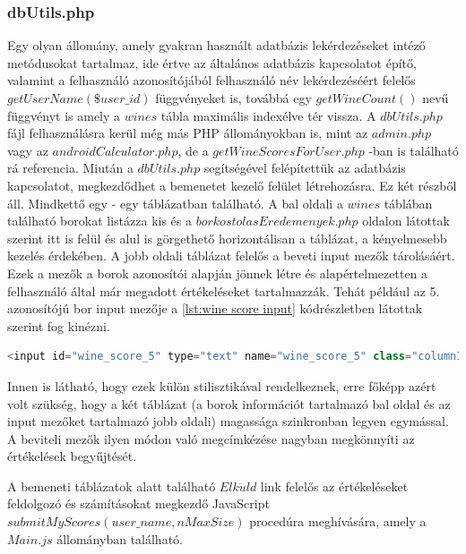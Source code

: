 \documentclass[12pt]{report}
\theoremstyle{definition}
\begin{document}
	\subsubsection{dbUtils.php} 
	Egy olyan állomány, amely gyakran használt adatbázis lekérdezéseket intéző metódusokat tartalmaz, ide értve az általános adatbázis kapcsolatot építő, valamint a felhasználó azonosítójából felhasználó név lekérdezéséért felelős $getUserName\left(\$user\_id\right)$ függvényeket is, továbbá egy $getWineCount\left(\right)$ nevű függvényt is amely a $wines$ tábla maximális indexélve tér vissza. A $dbUtils.php$ fájl felhasználásra kerül még más PHP állományokban is, mint az $admin.php$ vagy az  $androidCalculator.php$, de a \linebreak $getWineScoresForUser.php$ -ban is található rá referencia.
	\newline
	\newline
	Miután a $dbUtils.php$ segítségével felépítettük az adatbázis kapcsolatot, megkezdődhet a bemenetet kezelő felület létrehozásra. Ez két részből áll. Mindkettő egy - egy táblázatban található. A bal oldali a $wines$ táblában található borokat listázza kis és a \linebreak$borkostolasEredemenyek.php$ oldalon látottak szerint itt is felül és alul is görgethető horizontálisan a táblázat, a kényelmesebb kezelés érdekében. A jobb oldali táblázat felelős a beveti input mezők tárolásáért. Ezek a mezők a borok azonosítói alapján jönnek létre és alapértelmezetten a felhasználó által már megadott értékeléseket tartalmazzák. Tehát például az 5. azonosítójú bor input mezője a \ref{lst:wine score input} kódrészletben látottak szerint fog kinézni.
	
	\noindent\begin{minipage}{\linewidth}
		\begin{lstlisting}[language=php,label={lst:wine score input}, caption={Példa input mezőre címkézésére}]
<input id="wine_score_5" type="text" name="wine_score_5" class="columnInput" value="">
		\end{lstlisting}
	\end{minipage}
	
	Innen is látható, hogy ezek külön stilisztikával rendelkeznek, erre főképp azért volt szükség, hogy a két táblázat (a borok információt tartalmazó bal oldal és az input mezőket tartalmazó jobb oldali) magassága szinkronban legyen egymással. A beviteli mezők ilyen módon való megcímkézése nagyban megkönnyíti az értékelések begyűjtését.
	
	A bemeneti táblázatok alatt található $Elk\ddot{u}ld$ link felelős az értékeléseket feldolgozó és számításokat megkezdő JavaScript $submitMyScores\left(user\_name, nMaxSize\right)$ procedúra meghívására, amely a $Main.js$ állományban található. 
	
\end{document}
